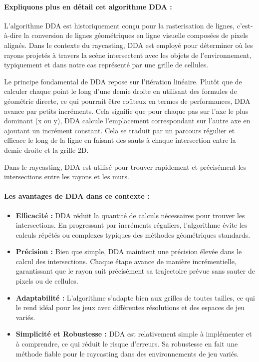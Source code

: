 \documentclass[12pt]{report}
\begin{document}
\paragraph{Expliquons plus en détail cet algorithme DDA :}
L'algorithme DDA est historiquement conçu pour la rasterisation de lignes, c'est-à-dire la conversion de lignes géométriques en ligne visuelle composées de pixels 
alignés. Dans le contexte du raycasting, DDA est employé pour déterminer où les rayons projetés à travers la scène intersectent avec les objets de l'environnement, 
typiquement et dans notre cas représenté par une grille de cellules.

Le principe fondamental de DDA repose sur l'itération linéaire. Plutôt que de calculer chaque point le long d'une demie droite en utilisant des formules de géométrie 
directe, ce qui pourrait être coûteux en termes de performances, DDA avance par petits incréments. Cela signifie que pour chaque pas sur l'axe le plus 
dominant (x ou y), DDA calcule l'emplacement correspondant sur l'autre axe en ajoutant un incrément constant. Cela se traduit par un parcours régulier et 
efficace le long de la ligne en faisant des sauts à chaque intersection entre la demie droite et la grille 2D.

Dans le raycasting, DDA est utilisé pour trouver rapidement et précisément les intersections entre les rayons et les murs. 

\paragraph{Les avantages de DDA dans ce contexte :}
\begin{itemize}
\item \textbf{Efficacité :} DDA réduit la quantité de calculs nécessaires pour trouver les intersections. En progressant par 
incréments réguliers, l'algorithme évite les calculs répétés ou complexes typiques des méthodes géométriques standards.
\item \textbf{Précision :} Bien que simple, DDA maintient une précision élevée dans le calcul des intersections. Chaque étape 
avance de manière incrémentielle, garantissant que le rayon suit précisément sa trajectoire prévue sans sauter de pixels ou de cellules.
\item \textbf{Adaptabilité :} L'algorithme s'adapte bien aux grilles de toutes tailles, ce qui le rend idéal pour les jeux avec 
différentes résolutions et des espaces de jeu variés.
\item \textbf{Simplicité et Robustesse :} DDA est relativement simple à implémenter et à comprendre, ce qui réduit le risque 
d'erreurs. Sa robustesse en fait une méthode fiable pour le raycasting dans des environnements de jeu variés.
\end{itemize}
\end{document}
